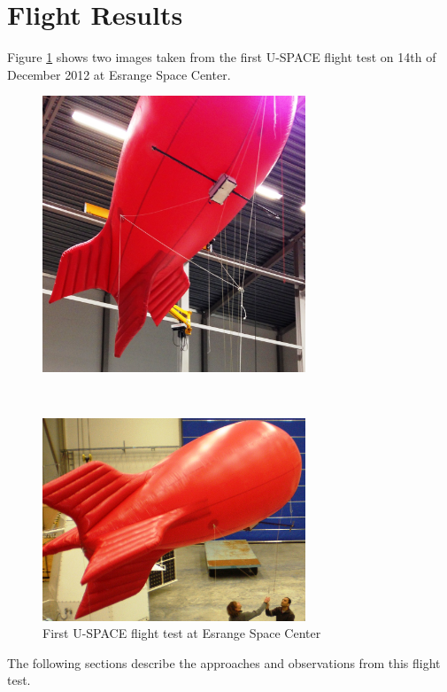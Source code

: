 \section{Flight Results}
\label{sec:flight_results}
%
Figure \ref{fig:FlightTest1} shows two images taken from the first U-SPACE flight test on 14th of December 2012 at Esrange Space Center.
%
\begin{figure}
\begin{minipage}[t]{\linewidth}
\centering
\includegraphics[width=0.7\textwidth]{figures/fig_FlightTest1_1}
\end{minipage}
\\[1mm]
\begin{minipage}[t]{\linewidth}
\centering
\includegraphics[width=0.7\textwidth]{figures/fig_FlightTest1_2}
\end{minipage}
\caption{First U-SPACE flight test at Esrange Space Center}
\label{fig:FlightTest1}
\end{figure}
%
%
The following sections describe the approaches and observations from this flight test.
%

